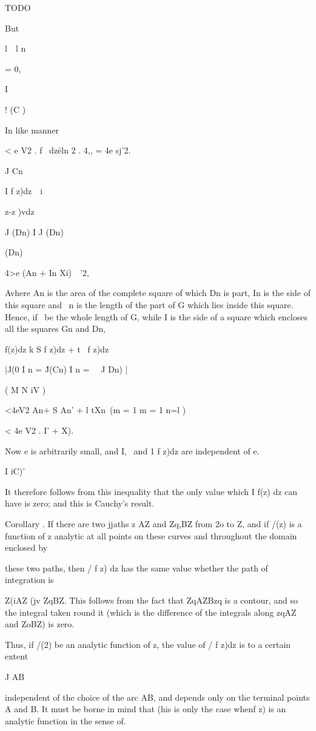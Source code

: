 TODO

But

l\ \ l n

= 0,

I

! (C )

In like manner

< e V2 . f \ dz\= eln \/2 . 4,, = 4e sj'2.

J Cn

I f z)dz\ \ i \ \ {z-z )vdz\

J (Dn) I J (Dn)

(Dn)

  4>e (An + In Xi)\ \ '2,

Avhere An is the area of the complete square of which Dn is part, In
is the side of this square and \ n is the length of the part of G
which lies inside this square. Hence, if \ be the whole length of G,
while I is the side of a square which encloses all the squares Gn and
Dn,

f(z)dz k S f z)dz + t \ f z)dz

|J(0 I n = \'J(Cn) I n = \ \ J Dn) |

( M N iV )

<4eV2 An+ S An' + l tXn\ (m = 1 m = 1 n=l )

< 4e V2 . I' + X).

Now e is arbitrarily small, and I, \ and 1 f z)dz are independent of
e.

I iC)'

It therefore follows from this inequality that the only value which I
f(z) dz can have is zero; and this is Cauchy's result.

%
%

Corollary . If there are two jjaths z AZ and Zq,BZ from 2o to Z, and
if /(z) is a function of z analytic at all points on these curves and
throughout the domain enclosed by

these two paths, then / f z) dz has the same value whether the path of
integration is

Z(iAZ (jv ZqBZ. This follows from the fact that ZqAZBzq is a contour,
and so the integral taken round it (which is the difference of the
integrals along zqAZ and ZoBZ) is zero.

Thus, if /(2) be an analytic function of z, the value of / f z)dz is
to a certain extent

J AB

independent of the choice of the arc AB, and depends only on the
terminal points A and B. It must be borne in mind that (his is only
the case whenf z) is an analytic function in the sense of.

}
